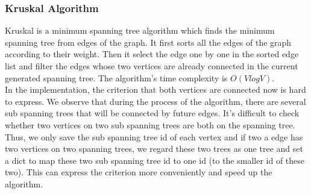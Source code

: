 \documentclass{article}
\begin{document}
\subsubsection{Kruskal Algorithm}
Kruskal is a minimum spanning tree algorithm which finds the minimum spanning tree from edges of the graph. It first sorts all the edges of the graph according to their weight. Then it select the edge one by one in the sorted edge list and filter the edges whose two vertices are already connected in the current generated spanning tree. The algorithm's time complexity is $O(V logV)$. \\
In the implementation, the criterion that both vertices are connected now is hard to express. We observe that during the process of the algorithm, there are several sub spanning trees that will be connected by future edges. It's difficult to check whether two vertices on two sub spanning trees are both on the spanning tree. Thus, we only save the sub spanning tree id of each vertex and if two a edge has two vertices on two spanning trees, we regard these two trees as one tree and set a dict to map these two sub spanning tree id to one id (to the smaller id of these two). This can express the criterion more conveniently and speed up the algorithm. \\
\end{document}
